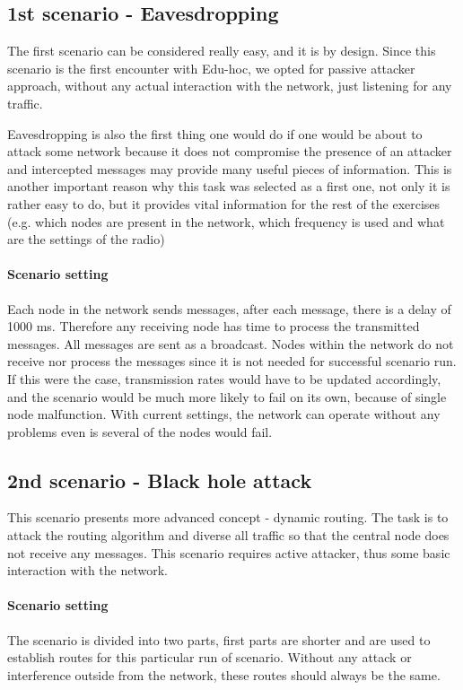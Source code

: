 \documentclass[
  print, %
  Table,   %
  nolof,     %
  nolot,     %
           oneside
]{fithesis3}
\begin{document}
    \subsection{1st scenario - Eavesdropping}\label{subsec:1st}
    The first scenario can be considered really easy, and it is by design. Since this scenario is the first encounter with Edu-hoc, we opted for passive attacker approach, without any actual interaction with the network, just listening for any traffic.

    Eavesdropping is also the first thing one would do if one would be about to attack some network because it does not compromise the presence of an attacker and intercepted messages may provide many useful pieces of information. This is another important reason why this task was selected as a first one, not only it is rather easy to do, but it provides vital information for the rest of the exercises (e.g. which nodes are present in the network, which frequency is used and what are the settings of the radio)

    \paragraph{Scenario setting}
    Each node in the network sends messages, after each message, there is a delay of 1000 ms. Therefore any receiving node has time to process the transmitted messages. All messages are sent as a broadcast. Nodes within the network do not receive nor process the messages since it is not needed for successful scenario run. If this were the case, transmission rates would have to be updated accordingly, and the scenario would be much more likely to fail on its own, because of single node malfunction. With current settings, the network can operate without any problems even is several of the nodes would fail.


    \subsection{2nd scenario - Black hole attack} \label{subsec:2nd}
    This scenario presents more advanced concept - dynamic routing. The task is to attack the routing algorithm and diverse all traffic so that the central node does not receive any messages. This scenario requires active attacker, thus some basic interaction with the network.

    \paragraph{Scenario setting}
    The scenario is divided into two parts, first parts are shorter and are used to establish routes for this particular run of scenario. Without any attack or interference outside from the network, these routes should always be the same.
\end{document}
